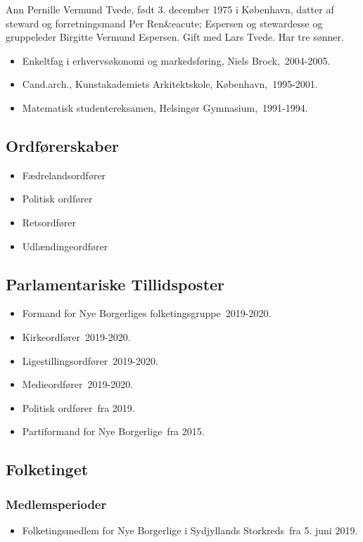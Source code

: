 \documentclass[11pt, a4paper]{awesome-cv}
\begin{document}
\makecvheader[R]
\makelettertitle
\begin{cvletter}
Ann Pernille Vermund Tvede, født 3. december 1975 i København, datter af steward og forretningsmand Per Ren&eacute; Espersen og stewardesse og gruppeleder Birgitte Vermund Espersen. Gift med Lars Tvede. Har tre sønner.

\begin{itemize}
\item Enkeltfag i erhvervsøkonomi og markedsføring, Niels Brock, 2004-2005.
\item Cand.arch., Kunstakademiets Arkitektskole, København, 1995-2001.
\item Matematisk studentereksamen, Helsingør Gymnasium, 1991-1994.
\end{itemize}
\subsection*{Ordførerskaber}
\begin{itemize}
\item Fædrelandsordfører
\item Politisk ordfører
\item Retsordfører
\item Udlændingeordfører
\end{itemize}
\subsection*{Parlamentariske Tillidsposter}
\begin{itemize}
\item Formand for Nye Borgerliges folketingsgruppe 2019-2020.
\item Kirkeordfører 2019-2020.
\item Ligestillingsordfører 2019-2020.
\item Medieordfører 2019-2020.
\item Politisk ordfører fra 2019.
\item Partiformand for Nye Borgerlige fra 2015.
\end{itemize}
\subsection*{Folketinget}
\subsubsection*{Medlemsperioder}
\begin{itemize}
\item Folketingsmedlem for Nye Borgerlige i Sydjyllands Storkreds fra 5. juni 2019.
\end{itemize}

\end{cvletter}
\end{document}
